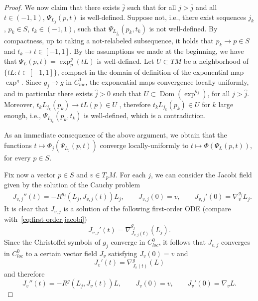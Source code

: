\documentclass[12pt,a4paper]{amsart}
\theoremstyle{plain}
\theoremstyle{definition}
\numberwithin{equation}{section}
\DeclareMathOperator{\Dom}{Dom}
\newcommand{\gflow}{\Psi}
\begin{document}
\begin{proof}
  We now claim that there exists $\bar j$ such that for all $j>\bar j$ and all $t\in(-1,1)$, $\gflow_{L_j}(p,t)$ is well-defined.
  Suppose not, i.e., there exist sequences $j_k$, $p_k\in S$, $t_k\in
  (-1,1)$, such that $\gflow_{L_{j_k}}(p_k,t_k)$ is not well-defined.
  By compactness, up to taking a not-relabeled subsequence, it holds
  that $p_k\to p\in S$ and $t_k\to t\in[-1,1]$.
  By the assumptions we made at the beginning, we have that $\gflow_L(p,t)=\exp_p^g(tL)$ is
  well-defined.
  Let $U\subset TM$ be a neighborhood of $\{tL \colon t\in [-1,1]\}$,
  compact in the domain of definition of the exponential map $\exp^g$.
  Since $g_j\to g$ in $C^1_{loc}$, the exponential maps convergence locally
  uniformly, and in particular there exists $\hat j>0$ such that
  $U\subset \Dom(\exp^{g_j})$, for all $j> \hat j$.
  Moreover, $t_kL_{j_k}(p_k)\to tL(p)\in U$ , therefore
  $t_kL_{j_k}(p_k)\in U$ for $k$ large enough, i.e.,
  $\gflow_{L_{j_k}}(p_k,t_k)$ is well-defined, which is a contradiction.

  As an immediate consequence of the above argument, we obtain that the functions $t\mapsto \Phi_j(\gflow_{L_j}(p,t))$ converge
  locally-uniformly to $t\mapsto \Phi(\gflow_{L}(p,t))$, for every
  $p\in S$.


 



Fix now a vector $p\in S$ and $v\in T_p M$.
%
For each $j$, we can consider the Jacobi field given by the solution
of the Cauchy problem
\begin{align}
  &
    J_{v,j}''(t)=
    -R^{g_j}(L_j,J_{v,j}(t))L_j
    ,
    \qquad
    J_{v,j}(0)=v
    ,
    \qquad
    J_{v,j}'(0)
    =
    \nabla_v^{g_j} L_j
    .
\end{align}
%
It is clear that $J_{v,j}$ is a solution of the following first-order
ODE (compare with~\eqref{eq:first-order-jacobi})
\begin{equation}
  J_{v,j}'(t)
  =
  \nabla^{g_j}_{J_{v,j}(t)}(L_j)
  .
\end{equation}
%
Since the Christoffel symbols of $g_j$ converge in $C^0_{loc}$,
it follows that 
$J_{v,j}$ converges in $C^0_{loc}$ to a certain vector field $J_{v}$ satisfying
$J_v(0)=v$ and
\begin{equation}
  J_{v}'(t)
  =
  \nabla^{g}_{J_{v}(t)}(L)
\end{equation}
and therefore
\begin{equation}
      J_{v}''(t)=
    -R^{g}(L_j,J_{v}(t))L
    ,
    \qquad
    J_{v}(0)=v
    ,
    \qquad
    J_{v}'(0)
    =
    \nabla_v L
    .
  \end{equation}


\end{proof}
\end{document}
